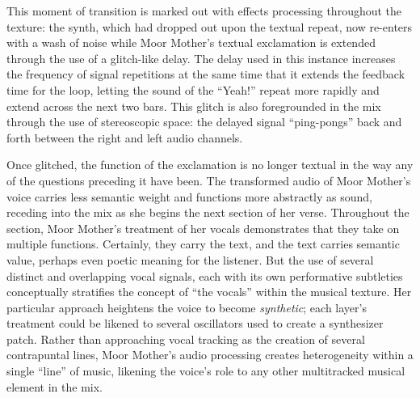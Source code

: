 This moment of transition is marked out with effects processing throughout the texture: the synth, which had dropped out
upon the textual repeat, now re-enters with a wash of noise while Moor Mother's textual exclamation is extended through
the use of a glitch-like delay. The delay used in this instance increases the frequency of signal repetitions at the same
time that it extends the feedback time for the loop, letting the sound of the ``Yeah!'' repeat more rapidly and extend
across the next two bars. This glitch is also foregrounded in the mix through the use of stereoscopic space: the delayed
signal ``ping-pongs'' back and forth between the right and left audio channels.

Once glitched, the function of the exclamation is no longer textual in the way any of the questions preceding it have been.
The transformed audio of Moor Mother's voice carries less semantic weight and functions more abstractly as sound, receding
into the mix as she begins the next section of her verse. Throughout the section, Moor Mother's treatment of her vocals
demonstrates that they take on multiple functions. Certainly, they carry the text, and the text carries semantic value, 
perhaps even poetic meaning for the listener. But the use of several distinct and overlapping vocal signals, each with its
own performative subtleties conceptually stratifies the concept of ``the vocals'' within the musical texture. Her particular
approach heightens the voice to become \emph{synthetic}; each layer's treatment could be likened to several oscillators used
to create a synthesizer patch. Rather than approaching vocal tracking as the creation of several contrapuntal lines, Moor
Mother's audio processing creates heterogeneity within a single ``line'' of music, likening the voice's role to any other
multitracked musical element in the mix.